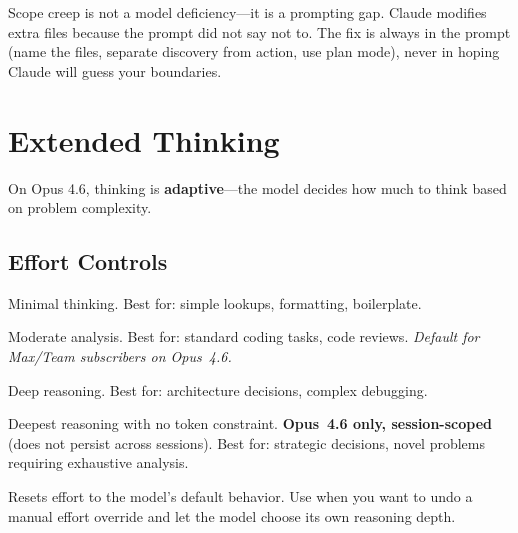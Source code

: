 
\begin{keyinsight}
Scope creep is not a model deficiency---it is a prompting gap.
Claude modifies extra files because the prompt did not say not to.
The fix is always in the prompt (name the files, separate discovery
from action, use plan mode), never in hoping Claude will guess
your boundaries.
\end{keyinsight}

\section{Extended Thinking}
\label{sec:thinking}


 On Opus 4.6, thinking is \textbf{adaptive}---the model
decides how much to think based on problem complexity.

\subsection{Effort Controls}


\begin{description}
  \item[\code{low}] Minimal thinking. Best for: simple lookups, formatting, boilerplate.
  \item[\code{medium}] Moderate analysis. Best for: standard coding tasks, code reviews.
    \emph{Default for Max/Team subscribers on Opus~4.6.}
  \item[\code{high}] Deep reasoning. Best for: architecture decisions, complex debugging.
  \item[\code{max}] Deepest reasoning with no token constraint.
    \textbf{Opus~4.6 only, session-scoped} (does not persist across sessions).
    Best for: strategic decisions, novel problems requiring exhaustive analysis.
  \item[\code{auto}] Resets effort to the model's default behavior.
    Use when you want to undo a manual effort override and let the model
    choose its own reasoning depth.
\end{description}

